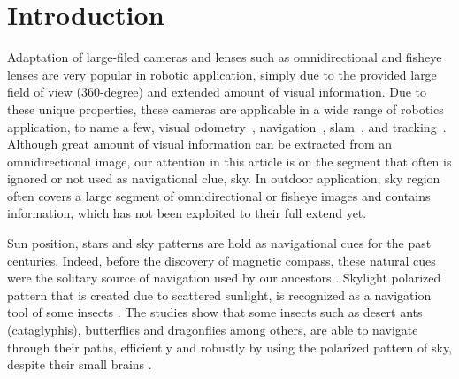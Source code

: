 \graphicspath{{./content/intro/figures/}}

\section{Introduction}
\label{sec:intro}

Adaptation of large-filed cameras and lenses such as omnidirectional and fisheye
lenses are very popular in robotic application, simply due to the provided
large field of view ($360$-degree) and extended amount of visual information.
Due to these unique properties, these cameras are applicable in a wide range of
robotics application, to name a few, visual
odometry~\cite{scaramuzza2008appearance}, navigation~\cite{winters2000omni},
\gls{slam}~\cite{kim2003slam}, and tracking~\cite{kobilarov2006people}.
Although great amount of visual information can be extracted from an omnidirectional
image, our attention in this article is on the segment that often is ignored or
not used as navigational clue, sky.
In outdoor application, sky region often covers
a large segment of omnidirectional or fisheye images and contains
information, which has not been exploited to their full extend yet.


Sun position, stars and sky patterns are hold as navigational cues for
the past centuries. Indeed, before the discovery of magnetic compass,
these natural cues were the solitary source of navigation used by our
ancestors \cite{barta2005psychophysical, horvath2011trail}.  Skylight
polarized pattern that is created due to scattered sunlight, is
recognized as a navigation tool of some insects
\cite{wehner03antnavigation, labhart202odometer}.  The studies show
that some insects such as desert ants (cataglyphis), butterflies and
dragonflies among others, are able to navigate through their paths,
efficiently and robustly by using the polarized pattern of sky,
despite their small brains \cite{labhart202odometer,
  wehner03antnavigation, hamaoui2017polarized}.


